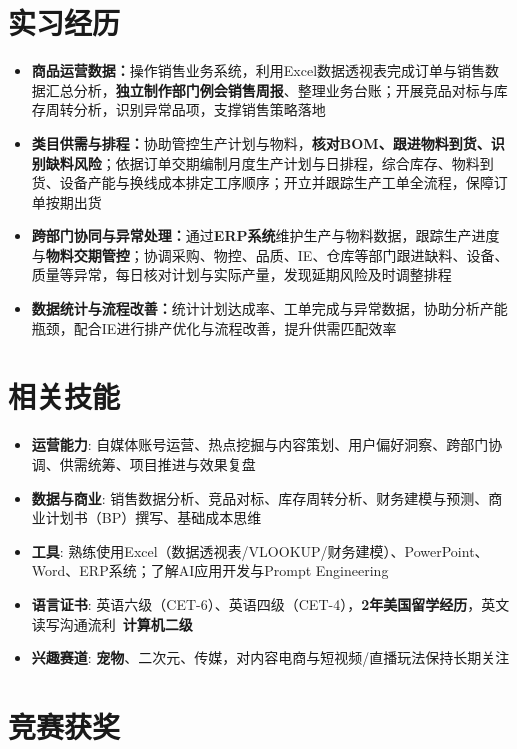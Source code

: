 \documentclass{resume}
\begin{document}
\section{实习经历}
\begin{itemize}[parsep=0.05ex]
  \item \textbf{商品运营数据：}操作销售业务系统，利用Excel数据透视表完成订单与销售数据汇总分析，\textbf{独立制作部门例会销售周报}、整理业务台账；开展竞品对标与库存周转分析，识别异常品项，支撑销售策略落地
  \item \textbf{类目供需与排程：}协助管控生产计划与物料，\textbf{核对BOM、跟进物料到货、识别缺料风险}；依据订单交期编制月度生产计划与日排程，综合库存、物料到货、设备产能与换线成本排定工序顺序；开立并跟踪生产工单全流程，保障订单按期出货
  \item \textbf{跨部门协同与异常处理：}通过\textbf{ERP系统}维护生产与物料数据，跟踪生产进度与\textbf{物料交期管控}；协调采购、物控、品质、IE、仓库等部门跟进缺料、设备、质量等异常，每日核对计划与实际产量，发现延期风险及时调整排程
  \item \textbf{数据统计与流程改善：}统计计划达成率、工单完成与异常数据，协助分析产能瓶颈，配合IE进行排产优化与流程改善，提升供需匹配效率
\end{itemize}

\section{相关技能}
\begin{itemize}[parsep=0.2ex]
  \item \textbf{运营能力}: 自媒体账号运营、热点挖掘与内容策划、用户偏好洞察、跨部门协调、供需统筹、项目推进与效果复盘
  \item \textbf{数据与商业}: 销售数据分析、竞品对标、库存周转分析、财务建模与预测、商业计划书（BP）撰写、基础成本思维
  \item \textbf{工具}: 熟练使用Excel（数据透视表/VLOOKUP/财务建模）、PowerPoint、Word、ERP系统；了解AI应用开发与Prompt Engineering
  \item \textbf{语言证书}: 英语六级（CET-6）、英语四级（CET-4），\textbf{2年美国留学经历}，英文读写沟通流利\textperiodcentered\ \textbf{计算机二级}
  \item \textbf{兴趣赛道}: \textbf{宠物}、二次元、传媒，对内容电商与短视频/直播玩法保持长期关注
\end{itemize}

\section{竞赛获奖}
\end{document}
